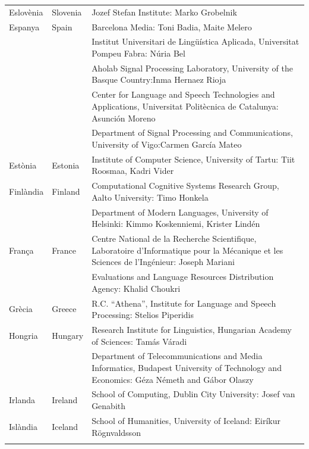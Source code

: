 \begin{longtable}{@{}llp{113mm}@{}}
  Eslovènia & \textcolor{grey1}{Slovenia} & Jozef Stefan Institute: Marko Grobelnik \\ \addlinespace 
  Espanya & \textcolor{grey1}{Spain} & Barcelona Media: Toni Badia, Maite Melero \\ \addlinespace 
  & & Institut Universitari de Lingüística Aplicada, Universitat Pompeu Fabra: Núria Bel \\ \addlinespace 
  & & Aholab Signal Processing Laboratory, University of the Basque Country:\newline Inma Hernaez Rioja \\ \addlinespace 
  & & Center for Language and Speech Technologies and Applications, Universitat Politècnica de Catalunya:  Asunción Moreno \\ \addlinespace 
  & & Department of Signal Processing and Communications, University of Vigo:\newline Carmen García Mateo \\ \addlinespace 
  Estònia & \textcolor{grey1}{Estonia} & Institute of Computer Science, University of Tartu: Tiit Roosmaa, Kadri Vider\\ \addlinespace
  Finlàndia & \textcolor{grey1}{Finland} & Computational Cognitive Systems Research Group, Aalto University: Timo Honkela\\ \addlinespace
  & & Department of Modern Languages, University of Helsinki: Kimmo Koskenniemi, Krister Lindén \\ \addlinespace
  França & \textcolor{grey1}{France} & Centre National de la Recherche Scientifique, Laboratoire d'Informatique pour la Mécanique et les Sciences de l'Ingénieur: Joseph Mariani \\ \addlinespace
  & & Evaluations and Language Resources Distribution Agency: Khalid Choukri\\ \addlinespace 
  Grècia & \textcolor{grey1}{Greece} & R.C. “Athena”, Institute for Language and Speech Processing: Stelios Piperidis\\ \addlinespace
  Hongria & \textcolor{grey1}{Hungary} & Research Institute for Linguistics, Hungarian Academy of Sciences: Tamás Váradi\\  \addlinespace
  & & Department of Telecommunications and Media Informatics, Budapest University of Technology and Economics: Géza Németh and Gábor Olaszy\\ \addlinespace
  Irlanda & \textcolor{grey1}{Ireland} & School of Computing, Dublin City University: Josef van Genabith\\ \addlinespace
  Islàndia & \textcolor{grey1}{Iceland} & School of Humanities, University of Iceland: Eiríkur Rögnvaldsson\\ \addlinespace

\end{longtable}
